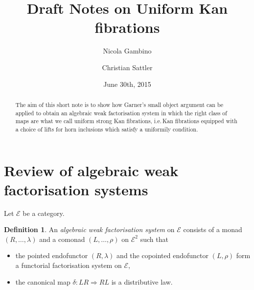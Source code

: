 \documentclass[reqno,10pt,a4paper,oneside]{amsart}
\author[]{Nicola Gambino}
\author{Christian Sattler}
\title[]{Draft Notes on Uniform Kan fibrations}
\date{June 30th, 2015}
\newcommand{\catE}{\mathcal{E}}
\theoremstyle{definition}
\newtheorem{definition}[theorem]{Definition}
\newcommand{\co}{\colon}
\begin{document}
\begin{abstract}
The aim of this short note is to show how Garner's small object argument can be applied to
obtain an algebraic weak factorisation system in which the right class of maps are what we
call uniform strong Kan fibrations, i.e.\,Kan fibrations equipped with a choice of lifts for horn
inclusions which satisfy a uniformily condition. 
\end{abstract}


\maketitle

 
 \section{Review of algebraic weak factorisation systems}
 
 
 
 Let $\catE$ be a category. 
 
 \begin{definition} An \emph{algebraic weak factorisation system} on $\catE$ consists of a monad 
 $(R, \ldots , \lambda)$ and a comonad $(L,  \ldots , \rho)$ on $\catE^2$ such that
 \begin{itemize}
 \item the pointed endofunctor $(R, \lambda)$ and the copointed endofunctor $(L, \rho)$ 
 form a functorial factorisation system on $\catE$,
 \item the canonical map $\delta \co LR \Rightarrow RL$ is a distributive law.
 \end{itemize}
 \end{definition}
 
\end{document}
